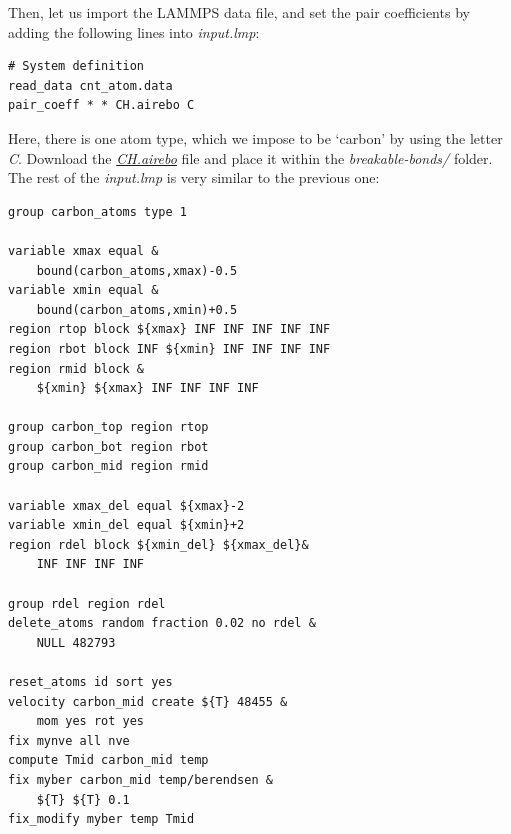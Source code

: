 \documentclass[9pt,tutorial]{livecoms}
\newcommand{\filepath}{https://raw.githubusercontent.com/lammpstutorials/lammpstutorials-article/main/files/}
\begin{document}
Then, let us import the LAMMPS data file, and set the pair coefficients by adding
the following lines into \textit{input.lmp}:
{\normalsize \begin{verbatim}
# System definition
read_data cnt_atom.data
pair_coeff * * CH.airebo C
\end{verbatim}}
Here, there is one atom type, which we impose to be `carbon' by using
the letter \textit{C}. Download the \href{\filepath tutorial2/breakable-bonds/CH.airebo}{\textit{CH.airebo}}
file and place it within the \textit{breakable-bonds/} folder. The rest of the
\textit{input.lmp} is very similar to the previous one:

{\normalsize \begin{verbatim}
group carbon_atoms type 1

variable xmax equal &
    bound(carbon_atoms,xmax)-0.5
variable xmin equal &
    bound(carbon_atoms,xmin)+0.5
region rtop block ${xmax} INF INF INF INF INF
region rbot block INF ${xmin} INF INF INF INF
region rmid block &
    ${xmin} ${xmax} INF INF INF INF

group carbon_top region rtop
group carbon_bot region rbot
group carbon_mid region rmid

variable xmax_del equal ${xmax}-2
variable xmin_del equal ${xmin}+2
region rdel block ${xmin_del} ${xmax_del}&
    INF INF INF INF

group rdel region rdel
delete_atoms random fraction 0.02 no rdel &
    NULL 482793

reset_atoms id sort yes
velocity carbon_mid create ${T} 48455 &
    mom yes rot yes
fix mynve all nve
compute Tmid carbon_mid temp
fix myber carbon_mid temp/berendsen &
    ${T} ${T} 0.1
fix_modify myber temp Tmid
\end{verbatim}}
\end{document}
